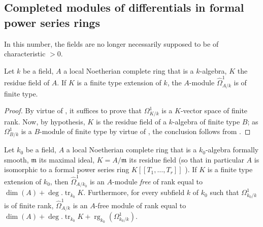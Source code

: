 \subsection{Completed modules of differentials in formal power series rings}
\label{subsection:0.21.9}

In this number, the fields are no longer necessarily supposed to be of characteristic $>0$.

\begin{lemma}[21.9.1]
\label{0.21.9.1}
Let $k$ be a field, $A$ a local Noetherian complete ring that is a $k$-algebra, $K$ the residue field of $A$.
If $K$ is a finite type extension of $k$, the $A$-module $\widehat{\Omega}^1_{A/k}$ is of finite type.
\end{lemma}

\begin{proof}
By virtue of , it suffices to prove that $\Omega^1_{K/k}$ is a $K$-vector space of finite rank.
Now, by hypothesis, $K$ is the residue field of a $k$-algebra of finite type $B$; as $\Omega^1_{B/k}$ is a $B$-module of finite type by virtue of , the conclusion follows from .
\end{proof}

\begin{proposition}[21.9.2]
\label{0.21.9.2}
Let $k_0$ be a field, $A$ a local Noetherian complete ring that is a $k_0$-algebra formally smooth, $\mathfrak{m}$ its maximal ideal, $K=A/\mathfrak{m}$ its residue field \textup{(}so that in particular $A$ is isomorphic to a formal power series ring $K[[T_1,\ldots,T_r]]$ \textup{)}.
If $K$ is a finite type extension of $k_0$, then $\widehat{\Omega}^1_{A/k_0}$ is an $A$-module \emph{free} of rank equal to $\dim(A)+\deg.\operatorname{tr}_{k_0} K$.
Furthermore, for every subfield $k$ of $k_0$ such that $\Omega^1_{k_0/k}$ is of finite rank, $\widehat{\Omega}^1_{A/k}$ is an $A$-free module of rank equal to $\dim(A)+\deg.\operatorname{tr}_{k_0} K+\operatorname{rg}_{k_0}(\Omega^1_{k_0/k})$.
\end{proposition}

